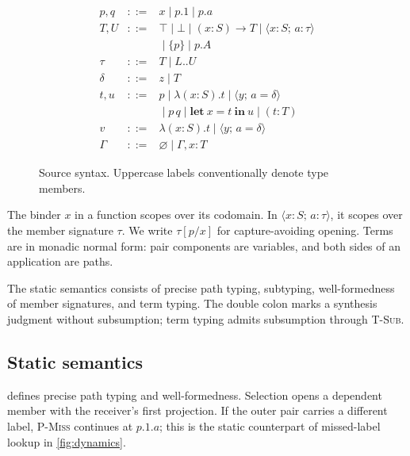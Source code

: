 \documentclass[acmsmall,screen,nonacm]{acmart}
\newcommand{\ctxempty}{\varnothing}
\newcommand{\sing}[1]{\{#1\}}
\newcommand{\pairty}[4]{\langle #1\!:\!#2;\,#3\!:\!#4\rangle}
\newcommand{\pairval}[3]{\langle #1;\,#2=#3\rangle}
\newcommand{\subst}[3]{#1[#2/#3]}
\begin{document}
\begin{figure}[H]
\[
\begin{array}{rcl}
p,q &::=& x \mid p.1 \mid p.a\\
T,U &::=& \top \mid \bot \mid (x:S)\to T
  \mid \pairty{x}{S}{a}{\tau}\\
&& {}\mid \sing{p} \mid p.A\\
\tau &::=& T \mid L..U\\
\delta &::=& z \mid T\\
t,u &::=& p \mid \lambda(x:S).t
  \mid \pairval{y}{a}{\delta}\\
&& {}\mid p\,q
  \mid \mathbf{let}\ x=t\ \mathbf{in}\ u
  \mid (t:T)\\
v &::=& \lambda(x:S).t \mid \pairval{y}{a}{\delta}\\
\Gamma &::=& \ctxempty \mid \Gamma,x:T
\end{array}
\]
\caption{Source syntax. Uppercase labels conventionally denote type members.}
\label{fig:syntax}
\end{figure}

The binder \(x\) in a function scopes over its codomain. In
\(\pairty{x}{S}{a}{\tau}\), it scopes over the member signature \(\tau\).
We write \(\subst{\tau}{p}{x}\) for capture-avoiding opening. Terms are in
monadic normal form: pair components are variables, and both sides of an
application are paths.

The static semantics consists of precise path typing, subtyping,
well-formedness of member signatures, and term typing. The double colon marks a
synthesis judgment without subsumption; term typing admits subsumption through
\textsc{T-Sub}.

\subsection{Static semantics}

 defines precise path typing and well-formedness. Selection
opens a dependent member with the receiver's first projection. If the outer
pair carries a different label, \textsc{P-Miss} continues at \(p.1.a\); this
is the static counterpart of missed-label lookup in \cref{fig:dynamics}.
\end{document}
